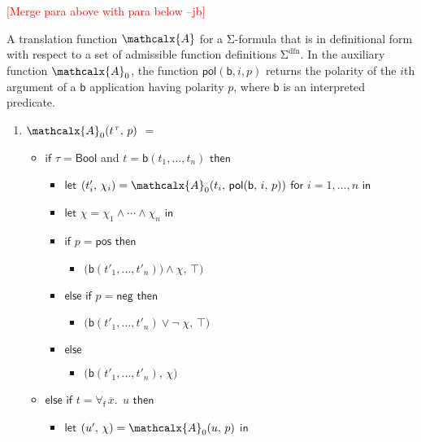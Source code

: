 \documentclass[runningheads,a4paper]{llncs}
\newcommand\return{}
\newcommand\bigtuple[1]{$\bigl(${#1}$\bigr)$}
\newcommand{\con}[1]{\mathsf{#1}}
\renewcommand\vec[1]{\overline{#1}}
\let\oldSigma=\Sigma
\def\Sigma{\mathrm{\oldSigma}}
\let\oldneg=\neg
\def\neg{\oldneg\;}
\let\oldvee=\vee
\def\vee{\mathrel{\oldvee}}
\let\oldwedge=\wedge
\def\wedge{\mathrel{\oldwedge}}
\newcommand{\conv}{\mathcalx{A}}
\newcommand{\sfundefs}[1]{#1^\mathrm{dfn}}
\newcommand{\ppos}{\con{pos}}
\newcommand{\pneg}{\con{neg}}
\newcommand{\pol}{\con{pol}}
\newcommand\ty[1]{\con{#1}}
\newcommand{\Bool}{\ty{Bool}}
\newcommand{\ltrue}{\top}
\newcommand{\boolop}{\con{b}}
\newcommand{\forallf}[1]{\forall_{\!#1\:}}
\newcommand{\rem}[1]{\textcolor{red}{[#1]}}
\newcommand{\jb}[1]{\rem{#1 --jb}}
\newcommand{\vthinspace}{\kern+0.083333em}
\newcommand{\typ}[1]{^{\vthinspace #1}}
\begin{document}
\jb{Merge para above with para below}

A translation function $\conv$ for a $\Sigma$-formula that is in definitional
form with respect to a set of admissible function definitions
$\sfundefs{\Sigma}$. In the auxiliary function $\conv_0$, the function $\pol(
\boolop, i, p )$ returns the polarity of the $i${th} argument of a
$\boolop$ application having polarity $p$, where $\boolop$ is an interpreted
predicate.

\begin{enumerate}
\item[\ ]
$\conv_0( t\typ{\tau},\, p )$ $=$
 \begin{itemize}
   \item[] $\mathsf{if}$ $\tau = \Bool$ and $t = \boolop(t_1,\ldots,t_n)$ $\mathsf{then}$
    \begin{itemize}
      \item[] $\mathsf{let}$ $( t'_i,\, \chi_i ) = \conv_0( t_i,\, \pol( \boolop,\, i,\, p ) )$ $\mathsf{for}$ $i = 1, \ldots, n$ $\mathsf{in}$
      \item[] $\mathsf{let}$ $\chi = \chi_1 \wedge \cdots \wedge \chi_n$ $\mathsf{in}$
      \item[] $\mathsf{if}$ $p = \ppos$ $\mathsf{then}$
      \begin{itemize}
        \item[] \return \bigtuple{$\boolop(t'_1, \ldots, t'_n) ) \wedge \chi,\, \ltrue$}
      \end{itemize}
      \item[] $\mathsf{else}$ $\mathsf{if}$ $p = \pneg$ $\mathsf{then}$
      \begin{itemize}
        \item[] \return \bigtuple{$\boolop(t'_1, \ldots, t'_n) \vee \neg \chi,\, \ltrue$}
      \end{itemize}
      \item[] $\mathsf{else}$
      \begin{itemize}
        \item[] \return \bigtuple{$\boolop(t'_1, \ldots, t'_n),\, \chi$}
      \end{itemize}
    \end{itemize}
  \item[] $\mathsf{else}$ $\mathsf{if}$ $t = \forallf{\con{f}} \vec x.\;\, u$ $\mathsf{then}$
    \begin{itemize}
      \item[] $\mathsf{let}$ $( u',\, \chi ) = \conv_0( u,\, p )$ $\mathsf{in}$

\end{itemize}
\end{itemize}
\end{enumerate}
\end{document}
